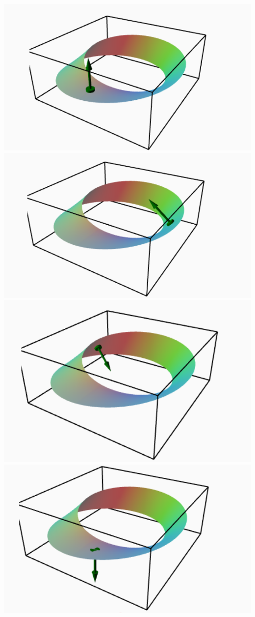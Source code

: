 \documentclass[]{article}
\begin{document}
\begin{center}
\includegraphics[width=.4\textwidth]{m1.png}
\includegraphics[width=.4\textwidth]{m2.png}
\includegraphics[width=.4\textwidth]{m3.png}
\includegraphics[width=.4\textwidth]{m4.png}
\end{center}
\end{document}
